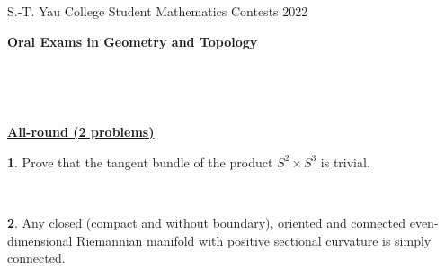 \documentclass[12pt,a4paper]{amsart}
\theoremstyle{definition}
\newtheorem{problem}{}
\begin{document}
\newpage

\begin{center}
S.-T. Yau College Student Mathematics Contests 2022\\

\vspace{0.1cm}

\Large {\bf Oral Exams in Geometry and Topology}




\end{center}

\

\

\begin{center}
\Large \underline{\bf All-round (2 problems)}

\end{center}

\setcounter{problem}{0} \vspace{1cm}

\begin{problem}
Prove that the tangent bundle of the product $S^2\times S^3$ is
trivial.
\end{problem}

\

\begin{problem}

Any closed (compact and without boundary), oriented and connected
even-dimensional Riemannian manifold with positive sectional
curvature is simply connected.

\end{problem}
\end{document}
